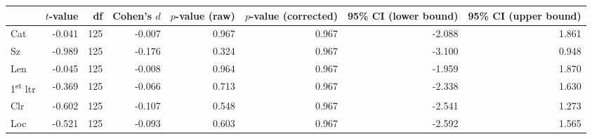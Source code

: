 \begin{tabular}{lrrrrrrr}
\toprule
{} & $t$-value &  df & Cohen's $d$ & $p$-value (raw) & $p$-value (corrected) & 95\% CI (lower bound) & 95\% CI (upper bound) \\
\midrule
Cat                       &    -0.041 & 125 &      -0.007 &           0.967 &                 0.967 &                -2.088 &                 1.861 \\
Sz                        &    -0.989 & 125 &      -0.176 &           0.324 &                 0.967 &                -3.100 &                 0.948 \\
Len                       &    -0.045 & 125 &      -0.008 &           0.964 &                 0.967 &                -1.959 &                 1.870 \\
1\textsuperscript{st} ltr &    -0.369 & 125 &      -0.066 &           0.713 &                 0.967 &                -2.338 &                 1.630 \\
Clr                       &    -0.602 & 125 &      -0.107 &           0.548 &                 0.967 &                -2.541 &                 1.273 \\
Loc                       &    -0.521 & 125 &      -0.093 &           0.603 &                 0.967 &                -2.592 &                 1.565 \\
\bottomrule
\end{tabular}
